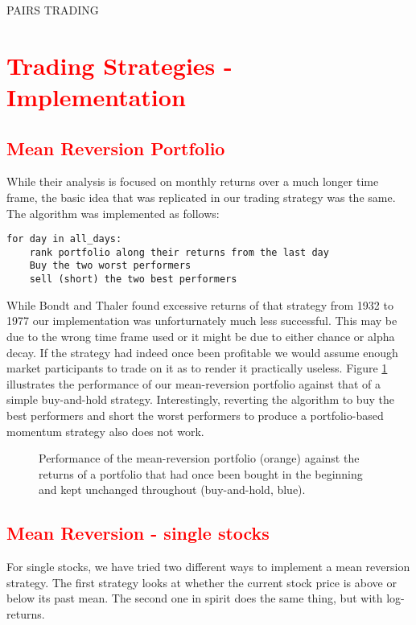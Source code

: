 PAIRS TRADING


\section{\textcolor{red}{Trading Strategies - Implementation}}
\subsection{\textcolor{red}{Mean Reversion Portfolio}}
While their analysis is focused on monthly returns over a much longer time frame, the basic idea that was replicated in our trading strategy was the same. The algorithm was implemented as follows: 

\begin{verbatim}
for day in all_days: 
    rank portfolio along their returns from the last day
    Buy the two worst performers
    sell (short) the two best performers
\end{verbatim}

While Bondt and Thaler found excessive returns of that strategy from 1932 to 1977 our implementation was unforturnately much less successful. This may be due to the wrong time frame used or it might be due to either chance or alpha decay. If the strategy had indeed once been profitable we would assume enough market participants to trade on it as to render it practically useless. Figure \ref{fig:mean reversion} illustrates the performance of our mean-reversion portfolio against that of a simple buy-and-hold strategy. Interestingly, reverting the algorithm to buy the best performers and short the worst performers to produce a portfolio-based momentum strategy also does not work. 

\begin{figure}[h!]
    \centering
    \begin{adjustbox}{width=.95\textwidth,center}
        
    \end{adjustbox}  
    \caption{Performance of the mean-reversion portfolio (orange) against the returns of a portfolio that had once been bought in the beginning and kept unchanged throughout (buy-and-hold, blue).}
    \label{fig:mean reversion}
\end{figure}{}

\subsection{\textcolor{red}{Mean Reversion - single stocks}}
For single stocks, we have tried two different ways to implement a mean reversion strategy. The first strategy looks at whether the current stock price is above or below its past mean. The second one in spirit does the same thing, but with log-returns. 

